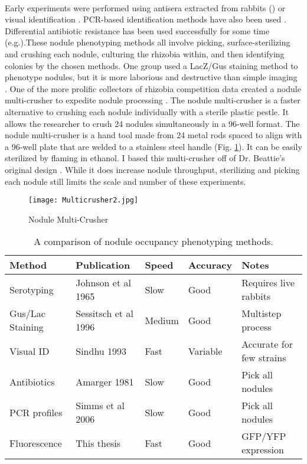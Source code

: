 \documentclass[12pt]{article}
\begin{document}
\begin{doublespace}
\paragraph{} 
Early experiments were performed using antisera extracted from rabbits (\cite{Weaver1974,Johnson1965}) or visual identification \cite{Sindhu2003}.  PCR-based identification methods have also been used \cite{Simms2006}. Differential antibiotic resistance has been used successfully for some time (e.g.\cite{Beattie1989,Patankar2009}).These nodule phenotyping methods all involve picking, surface-sterilizing and crushing each nodule, culturing the rhizobia within, and then identifying colonies by the chosen methods. One group used a LacZ/Gus staining method to phenotype nodules, but it is more laborious and destructive than simple imaging \cite{Sessitsch1996}.  One of the more prolific collectors of rhizobia competition data created a nodule multi-crusher to expedite nodule processing \cite{Beattie1989}. The nodule multi-crusher is a faster alternative to crushing each nodule individually with a sterile plastic pestle. It allows the researcher to crush 24 nodules simultaneously in a 96-well format. The nodule multi-crusher is a hand tool made from 24 metal rods spaced to align with a 96-well plate that are welded to a stainless steel handle (Fig. \ref{fig:multicrusher}). It can be easily sterilized by flaming in ethanol. I based this multi-crusher off of Dr. Beattie's original design \cite{Beattie1989}. While it does increase nodule throughput, sterilizing and picking each nodule still limits the scale and number of these experiments.
		\begin{figure}[h!]
			\centering
			\texttt{[image: Multicrusher2.jpg]}
			\caption{Nodule Multi-Crusher}
			\label{fig:multicrusher}
		\end{figure}


\begin{table}[]
	\centering
	\label{pheno}
	\caption{A comparison of nodule occupancy phenotyping methods.} %
	\begin{tabular}{@{}lllll@{}}
		\toprule
		Method                          & Publication & Speed & Accuracy & Notes \\ \midrule
		Serotyping                        & Johnson et al 1965  & Slow    & Good &  Requires live rabbits \\ 
		Gus/Lac Staining                 & Sessitsch et al 1996            & Medium  & Good  &   Multistep process\\
		Visual ID              & Sindhu 1993            & Fast    & Variable&   Accurate for few strains\\
		Antibiotics           & Amarger 1981 & Slow    & Good  &   Pick all nodules\\
		PCR profiles                       & Simms et al 2006 & Slow    & Good  &   Pick all nodules\\
		Fluorescence               & This thesis          & Fast    & Good  &  GFP/YFP expression \\ \bottomrule
	\end{tabular}
\end{table}


\end{doublespace}
\end{document}
